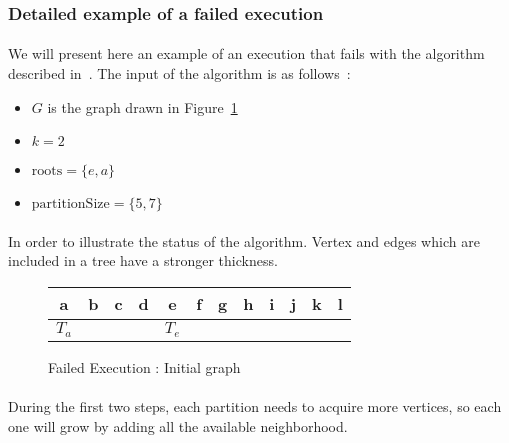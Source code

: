 \label{counter-example}
\subsubsection{Detailed example of a failed execution}


\paragraph{}
We will present here an example of an execution that fails with the algorithm
described in~\cite{JS94}. The input of the algorithm is as follows~:
\begin{itemize}
\item $G$ is the graph drawn in Figure~\ref{FE_K2_init}
\item $k = 2$
\item $\mathrm{roots} = \{ e, a \}$
\item $\mathrm{partitionSize} = \{ 5, 7\}$
\end{itemize}

\paragraph{}
In order to illustrate the status of the algorithm. Vertex and edges which are
included in a tree have a stronger thickness.

\begin{figure}[H]
  \caption{\label{FE_K2_init}Failed Execution : Initial graph}
  \begin{center}
    \begin{tikzpicture}[scale=0.9,transform shape]
      
    \end{tikzpicture}

    \begin{tabular}{|c|c|c|c|c|c|c|c|c|c|c|c|}
\hline
a & b & c & d & e & f & g & h & i & j & k & l\\
\hline
$T_a$ & & & & $T_e$ & & & & & & &\\
\hline
    \end{tabular}
  \end{center}
\end{figure}

\paragraph{}
During the first two steps, each partition needs to acquire more vertices, so
each one will grow by adding all the available neighborhood.


